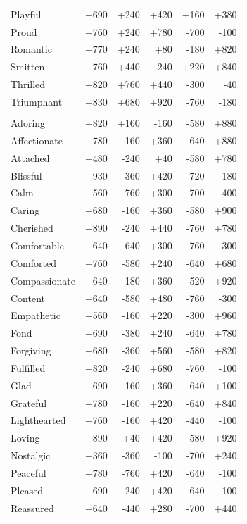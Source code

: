 \begin{longtable}{@{}p{}rrrrr@{}}
Playful & +690 & +240 & +420 & +160 & +380 \\
Proud & +760 & +240 & +780 & -700 & -100 \\
Romantic & +770 & +240 & +80 & -180 & +820 \\
Smitten & +760 & +440 & -240 & +220 & +840 \\
Thrilled & +820 & +760 & +440 & -300 & -40 \\
Triumphant & +830 & +680 & +920 & -760 & -180 \\
\addlinespace[2pt]\multicolumn{6}{@{}l}{\textbf{Calm Positive} ($n=39$)} \\
Adoring & +820 & +160 & -160 & -580 & +880 \\
Affectionate & +780 & -160 & +360 & -640 & +880 \\
Attached & +480 & -240 & +40 & -580 & +780 \\
Blissful & +930 & -360 & +420 & -720 & -180 \\
Calm & +560 & -760 & +300 & -700 & -400 \\
Caring & +680 & -160 & +360 & -580 & +900 \\
Cherished & +890 & -240 & +440 & -760 & +780 \\
Comfortable & +640 & -640 & +300 & -760 & -300 \\
Comforted & +760 & -580 & +240 & -640 & +680 \\
Compassionate & +640 & -180 & +360 & -520 & +920 \\
Content & +640 & -580 & +480 & -760 & -300 \\
Empathetic & +560 & -160 & +220 & -300 & +960 \\
Fond & +690 & -380 & +240 & -640 & +780 \\
Forgiving & +680 & -360 & +560 & -580 & +820 \\
Fulfilled & +820 & -240 & +680 & -760 & -100 \\
Glad & +690 & -160 & +360 & -640 & +100 \\
Grateful & +780 & -160 & +220 & -640 & +840 \\
Lighthearted & +760 & -160 & +420 & -440 & -100 \\
Loving & +890 & +40 & +420 & -580 & +920 \\
Nostalgic & +360 & -360 & -100 & -700 & +240 \\
Peaceful & +780 & -760 & +420 & -640 & -100 \\
Pleased & +690 & -240 & +420 & -640 & -100 \\
Reassured & +640 & -440 & +280 & -700 & +440 \\

\end{longtable}
